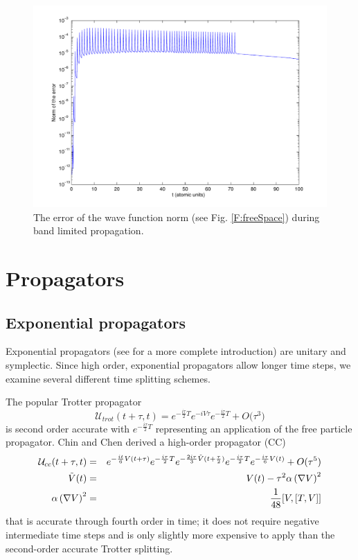 \documentclass[review,letterpaper]{elsarticle}
\begin{document}
\begin{figure}[hbt]
\includegraphics[width=5in]{errorT100}
\caption{The error of the wave function norm (see Fig. \ref{F:freeSpace}) during band limited propagation.}
\label{F:errorT100}
\end{figure}




\section{Propagators}
\label{S:prop}
\subsection{Exponential propagators}
\label{S:ExpProp}
Exponential propagators (see  \cite{Ta07} for a more complete introduction)
are unitary and symplectic. Since high order, exponential propagators allow longer time steps,
we examine several different time splitting schemes.

The popular Trotter propagator
\begin{equation}
\label{E:CC}
\mathcal{U}_{trot}(t+\tau,t) =
                     e^{-\frac{i \tau}2 T}
                     e^{-i {V}\tau}
                     e^{-\frac{i \tau}2 T}
                   + O\big(\tau^3 \big)
\end{equation}
is second order accurate with $e^{-\frac{i\tau}{2} T}$ representing an application of the free particle propagator.
Chin and Chen \cite{Chin:2001vs} derived a high-order propagator (CC)
\begin{eqnarray*}
\mathcal{U}_{cc}(t+\tau,t) &=&
e^{-{\frac{i t }{6}}V(t+\tau )}
e^{-{\frac{i\tau }{2}}{T}}
e^{-{\frac{2i\tau }{3}}\tilde{V}(t+\frac{\tau }{2})}
e^{-{\frac{i\tau }{2}}{T}}
e^{-{\frac{i\tau }{6}}V(t)}
+O(\tau^5) \notag\\
\tilde{V}(t)&=&V(t) - \tau^2 \alpha \left(\nabla V\right)^{2} \\
\alpha \left(\nabla V\right)^{2} &=& \frac{1}{48} [V,[T,V]] \notag
\end{eqnarray*}
that is accurate through fourth order in time; it does not require negative intermediate
time steps and is only slightly more expensive to apply than the second-order
accurate Trotter splitting.
\end{document}
